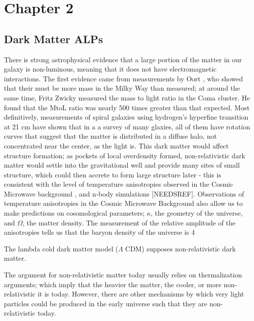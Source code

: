 \documentclass[12pt, twosides]{book}
\begin{document}
\chapter{Chapter 2}
\section{Dark Matter ALPs}

There is strong astrophysical evidence that a large portion of the matter in our galaxy is non-luminous, meaning that it does not have electromagnetic interactions. The first evidence came from measurements by Oort \cite{oort32}, who showed that their must be more mass in the Milky Way than measured; at around the same time, Fritz Zwicky \cite{zwicky37} measured the mass to light ratio in the Coma cluster. He found that the MtoL ratio was nearly 500 times greater than that expected. Most definitively, measurements of spiral galaxies using hydrogen's hyperfine transition at 21 cm have shown that in a a survey of many glaxies, all of them have rotation curves that suggest that the matter is distributed in a diffuse halo, not concentrated near the center, as the light is\cite{rubin80}. This dark matter would affect structure formation; as pockets of local overdensity formed, non-relativistic dark matter would settle into the gravitational well and provide many sites of small structure, which could then accrete to form large structure later - this is consistent with the level of temperature anisotropies observed in the Cosmic Microwave background \cite{planck13}, and n-body simulations [NEEDSREF]. Observations of temperature anisotropies in the Cosmic Microwave Background also allow us to make predictions on cosomological parameters; $\kappa$, the geometry of the universe, and $\Omega$, the matter density. The measurement of the relative amplitude of the anisotropies tells us that the baryon density of the universe is 4%

The lambda cold dark matter model ($\Lambda$ CDM) supposes non-relativistic dark matter. 

The argument for non-relativistic matter today usually relies on thermalization arguments; which imply that the heavier the matter, the cooler, or more non-relativistic it is today. However, there are other mechanisms by which very light particles could be produced in the early universe such that they are non-relativistic today.
\end{document}
